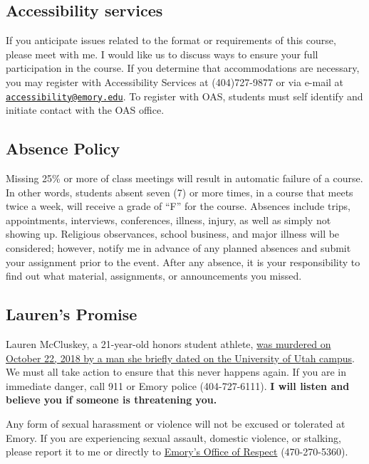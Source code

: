 \documentclass[11pt,]{article}
\begin{document}
\hypertarget{accessibility-services}{%
\subsection{Accessibility services}\label{accessibility-services}}

If you anticipate issues related to the format or requirements of this
course, please meet with me. I would like us to discuss ways to ensure
your full participation in the course. If you determine that
accommodations are necessary, you may register with Accessibility
Services at (404)727-9877 or via e-mail at
\href{mailto:accessibility@emory.edu}{\nolinkurl{accessibility@emory.edu}}.
To register with OAS, students must self identify and initiate contact
with the OAS office.

\hypertarget{absence-policy}{%
\subsection{Absence Policy}\label{absence-policy}}

Missing 25\% or more of class meetings will result in automatic failure
of a course. In other words, students absent seven (7) or more times, in
a course that meets twice a week, will receive a grade of ``F'' for the
course. Absences include trips, appointments, interviews, conferences,
illness, injury, as well as simply not showing up. Religious
observances, school business, and major illness will be considered;
however, notify me in advance of any planned absences and submit your
assignment prior to the event. After any absence, it is your
responsibility to find out what material, assignments, or announcements
you missed.

\hypertarget{laurens-promise}{%
\subsection{Lauren's Promise}\label{laurens-promise}}

Lauren McCluskey, a 21-year-old honors student athlete,
\href{https://www.sltrib.com/opinion/commentary/2019/02/10/commentary-failing-lauren/}{was
murdered on October 22, 2018 by a man she briefly dated on the
University of Utah campus}. We must all take action to ensure that this
never happens again. If you are in immediate danger, call 911 or Emory
police (404-727-6111). \textbf{I will listen and believe you if someone
is threatening you.}

Any form of sexual harassment or violence will not be excused or
tolerated at Emory. If you are experiencing sexual assault, domestic
violence, or stalking, please report it to me or directly to
\href{http://respect.emory.edu/index.html}{Emory's Office of Respect}
(470-270-5360).
\end{document}
